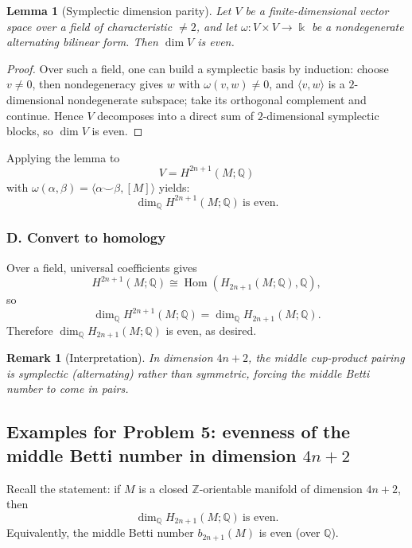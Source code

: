 \documentclass[12pt,a4paper]{article}
\theoremstyle{notespace}
\newtheorem{remark}{Remark}[section]
\newtheorem{lemma}{Lemma}[section]
\DeclareMathOperator{\Hom}{Hom}
\begin{document}
\begin{lemma}[Symplectic dimension parity]
	Let $V$ be a finite-dimensional vector space over a field of characteristic $\neq 2$, and let
	$\omega:V\times V\to \Bbbk$ be a nondegenerate alternating bilinear form. Then $\dim V$ is even.
\end{lemma}

\begin{proof}
	Over such a field, one can build a symplectic basis by induction: choose $v\neq 0$, then nondegeneracy gives $w$ with $\omega(v,w)\neq 0$, and $\langle v,w\rangle$ is a $2$-dimensional nondegenerate subspace; take its orthogonal complement and continue. Hence $V$ decomposes into a direct sum of $2$-dimensional symplectic blocks, so $\dim V$ is even.
\end{proof}

Applying the lemma to
\[
V=H^{2n+1}(M;\mathbb Q)
\]
with $\omega(\alpha,\beta)=\langle \alpha\smile\beta,[M]\rangle$ yields:
\[
\dim_{\mathbb Q} H^{2n+1}(M;\mathbb Q)\ \text{is even.}
\]

\subsubsection{D. Convert to homology}

Over a field, universal coefficients gives
\[
H^{2n+1}(M;\mathbb Q)\cong \Hom(H_{2n+1}(M;\mathbb Q),\mathbb Q),
\]
so
\[
\dim_{\mathbb Q} H^{2n+1}(M;\mathbb Q)=\dim_{\mathbb Q} H_{2n+1}(M;\mathbb Q).
\]
Therefore $\dim_{\mathbb Q} H_{2n+1}(M;\mathbb Q)$ is even, as desired.

\begin{remark}[Interpretation]
	In dimension $4n+2$, the middle cup-product pairing is symplectic (alternating) rather than symmetric, forcing the middle Betti number to come in pairs.
\end{remark}


\subsection{Examples for Problem 5: evenness of the middle Betti number in dimension \(4n+2\)}

Recall the statement: if \(M\) is a closed \(\mathbb Z\)-orientable manifold of dimension \(4n+2\),
then
\[
\dim_{\mathbb Q} H_{2n+1}(M;\mathbb Q)\ \text{is even}.
\]
Equivalently, the middle Betti number \(b_{2n+1}(M)\) is even (over \(\mathbb Q\)).
\end{document}
